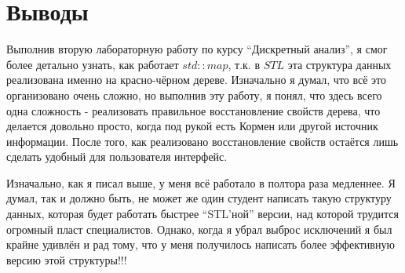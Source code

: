 \section{Выводы}




Выполнив вторую лабораторную работу по курсу \enquote{Дискретный анализ}, я смог более детально узнать, как работает $std::map$, т.к. в $STL$ эта структура данных реализована именно на красно-чёрном дереве. Изначально я думал, что всё это организовано очень сложно, но выполнив эту работу, я понял, что здесь всего одна сложность - реализовать правильное восстановление свойств дерева, что делается довольно просто, когда под рукой есть Кормен или другой источник информации. После того, как реализовано восстановление свойств остаётся лишь сделать удобный для пользователя интерфейс.


Изначально, как я писал выше, у меня всё работало в полтора раза медленнее. Я думал, так и должно быть, не может же один студент написать такую структуру данных, которая будет работать быстрее \enquote{STL'ной} версии, над которой трудится огромный пласт специалистов. Однако, когда я убрал выброс исключений я был крайне удивлён и рад тому, что у меня получилось написать более эффективную версию этой структуры!!!


\pagebreak
